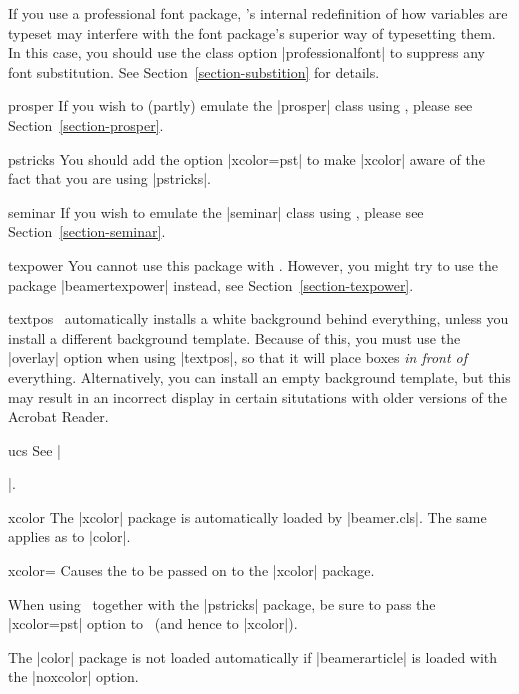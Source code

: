 \begin{package}{{\normalfont{}}}
  \beamernote
  If you use a professional font package, \beamer's internal redefinition of how variables are typeset may interfere with the font package's superior way of typesetting them. In this case, you should use the class option |professionalfont| to suppress any font substitution. See Section~\ref{section-substition} for details.
\end{package}

\begin{class}{{prosper}}
  If you wish to (partly) emulate the |prosper| class using \beamer, please see Section~\ref{section-prosper}.
\end{class}

\begin{package}{{pstricks}}
  You should add the option |xcolor=pst| to make |xcolor| aware of the fact that you are using |pstricks|.
\end{package}

\begin{class}{{seminar}}
  If you wish to emulate the |seminar| class using \beamer, please see Section~\ref{section-seminar}.
\end{class}

\begin{package}{{texpower}}
  You cannot use this package with \beamer. However, you might try to use the package |beamertexpower| instead, see Section~\ref{section-texpower}.
\end{package}

\begin{package}{{textpos}}
  \beamernote
  \beamer\ automatically installs a white background behind everything, unless you install a different background template. Because of this, you must use the |overlay| option when using |textpos|, so that it will place boxes \emph{in front of} everything. Alternatively, you can install an empty background template, but this may result in an incorrect display in certain situtations with older versions of the Acrobat Reader.
\end{package}

\begin{package}{{ucs}}
  See |\usepackage[utf8,utf8x]{inputenc}|.
\end{package}

\begin{package}{{xcolor}}
  \beamernote
  The |xcolor| package is automatically loaded by |beamer.cls|. The same applies as to |color|.

  \begin{classoption}{xcolor={\normalfont{}}}
    Causes the  to be passed on to the |xcolor| package.
  \end{classoption}

  When using \beamer\ together with the |pstricks| package, be sure to pass the |xcolor=pst| option to \beamer\ (and hence to |xcolor|).

  \articlenote
  The |color| package is not loaded automatically if |beamerarticle| is loaded with the |noxcolor| option.
\end{package}

